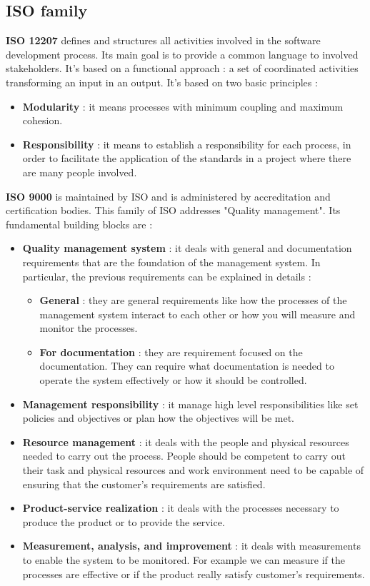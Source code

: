 \documentclass[11pt]{article}
\begin{document}
\subsection{ISO family}
\textbf{ISO 12207} defines and structures all activities involved in the software development process. Its main goal is to provide a common language to involved stakeholders. It's based on a functional approach : a set of coordinated activities transforming an input in an output. It's based on two basic principles :
\begin{itemize}
\item \textbf{Modularity} : it means processes with minimum coupling and maximum cohesion.
\item \textbf{Responsibility} : it means to establish a responsibility for each process, in order to facilitate the application of the standards in a project where there are many people involved.
\end{itemize}
\textbf{ISO 9000} is maintained by ISO and is administered by accreditation and certification bodies. This family of ISO addresses "Quality management". Its fundamental building blocks are :
\begin{itemize}
\item \textbf{Quality management system} : it deals with general and documentation requirements that are the foundation of the management system. In particular, the previous requirements can be explained in details :
\begin{itemize}
\item \textbf{General} : they are general requirements like how the processes of the management system interact to each other or how you will measure and monitor the processes.
\item \textbf{For documentation} : they are requirement focused on the documentation. They can require what documentation is needed to operate the system effectively or how it should be controlled.
\end{itemize}
\item \textbf{Management responsibility} : it manage high level responsibilities like set policies and objectives or plan how the objectives will be met.
\item \textbf{Resource management} : it deals with the people and physical resources needed to carry out the process. People should be competent to carry out their task and physical resources and work environment need to be capable of ensuring that the customer's requirements are satisfied.
\item \textbf{Product-service realization} : it deals with the processes necessary to produce the product or to provide the service.
\item \textbf{Measurement, analysis, and improvement} : it deals with measurements to enable the system to be monitored. For example we can measure if the processes are effective or if the product really satisfy customer's requirements.
\end{itemize}
\end{document}

